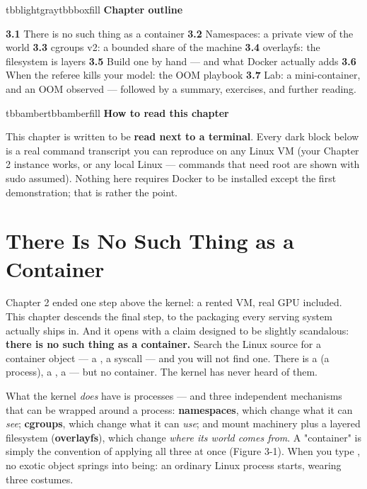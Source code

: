 \vspace{5.0pt}

\begin{calloutbox}{tbblightgray}{tbbboxfill}
{\normalsize\bfseries\color{tbbink}Chapter outline}\par\vspace{3pt}
\textbf{3.1} There is no such thing as a container    \textbf{3.2} Namespaces: a private view of the world    \textbf{3.3} cgroups v2: a bounded share of the machine    \textbf{3.4} overlayfs: the filesystem is layers    \textbf{3.5} Build one by hand — and what Docker actually adds    \textbf{3.6} When the referee kills your model: the OOM playbook    \textbf{3.7} Lab: a mini-container, and an OOM observed — followed by a summary, exercises, and further reading.
\end{calloutbox}

\vspace{3.0pt}

\begin{calloutbox}{tbbamber}{tbbamberfill}
{\normalsize\bfseries\color{tbbamberdark}How to read this chapter}\par\vspace{3pt}
This chapter is written to be \textbf{read next to a terminal}. Every dark block below is a real command transcript you can reproduce on any Linux VM (your Chapter 2 instance works, or any local Linux — commands that need root are shown with sudo assumed). Nothing here requires Docker to be installed except the first demonstration; that is rather the point.
\end{calloutbox}

\section{There Is No Such Thing as a Container}

Chapter 2 ended one step above the kernel: a rented VM, real GPU included. This chapter descends the final step, to the packaging every serving system actually ships in. And it opens with a claim designed to be slightly scandalous: \textbf{there is no such thing as a container.} Search the Linux source for a container object — a , a  syscall — and you will not find one. There is a  (a process), a , a  — but no container. The kernel has never heard of them.

What the kernel \textit{does} have is processes — and three independent mechanisms that can be wrapped around a process: \textbf{namespaces}, which change what it can \textit{see}; \textbf{cgroups}, which change what it can \textit{use}; and mount machinery plus a layered filesystem (\textbf{overlayfs}), which change \textit{where its world comes from}. A "container" is simply the convention of applying all three at once (Figure 3-1). When you type , no exotic object springs into being: an ordinary Linux process starts, wearing three costumes.

